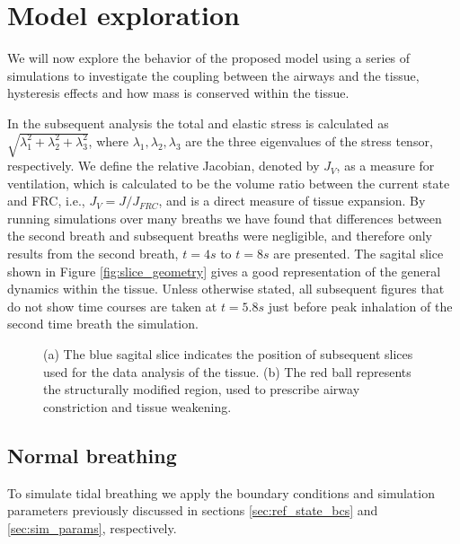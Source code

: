 \section{Model exploration}
\label{sec:numerical_results}
We will now explore the behavior of the proposed model using a series of simulations to investigate the coupling between the airways and the tissue, hysteresis effects and how mass is conserved within the tissue.

In the subsequent analysis the total and elastic stress is calculated as $ \sqrt{\lambda_{1}^{2} + \lambda_{2}^{2}+\lambda_{3}^{2}} $, where $\lambda_{1},\lambda_{2},\lambda_{3}$ are the three eigenvalues of the stress tensor, respectively. We define the relative Jacobian, denoted by $J_{V}$, as a measure for ventilation, which is calculated to be the volume ratio between the current state and FRC, i.e., $J_V = J/J_{FRC}$, and is a direct measure of tissue expansion. By running simulations over many breaths we have found that differences between the second breath and subsequent breaths were negligible, and therefore only results from the second breath, $t=4s$ to $t=8s$ are presented. The sagital slice shown in Figure \ref{fig:slice_geometry} gives a good representation of the general dynamics within the tissue. Unless otherwise stated, all subsequent figures that do not show time courses are taken at $t=5.8s$ just before  peak inhalation of the second time breath the simulation.



\begin{figure}[h]
  \centering
\caption{(a) The blue sagital slice indicates the position of subsequent slices used for the data analysis of the tissue. (b) The red ball represents the structurally modified region, used to prescribe airway constriction and tissue weakening.}
\end{figure}
%
\subsection{Normal breathing}
To simulate tidal breathing we apply the boundary conditions and simulation parameters previously discussed in sections \ref{sec:ref_state_bcs} and \ref{sec:sim_params}, respectively.

